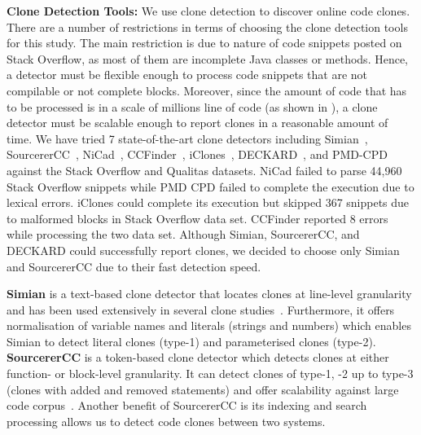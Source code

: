 \documentclass[10pt,journal,compsoc]{IEEEtran}
\begin{document}
\textbf{Clone Detection Tools: } We use clone detection to discover online code
clones. %
There are a number of restrictions in terms of choosing the clone detection
tools for this study. The main restriction is due to nature of code snippets
posted on Stack Overflow, as most of them are incomplete Java classes or
methods. Hence, a detector must be flexible enough to process code snippets that
are not compilable or not complete blocks. Moreover, since the amount of code
that has to be processed is in a scale of millions line of code (as shown in
), a clone detector must be scalable enough to report clones
in a reasonable amount of time. We have tried 7 state-of-the-art clone detectors
including Simian~\cite{simian}, SourcererCC~\cite{Sajnani2016},
NiCad~\cite{Cordy,Roy2008}, CCFinder~\cite{Kamiya2002}, iClones~\cite{Gode2009},
DECKARD~\cite{Jiang2007a}, and PMD-CPD~\cite{pmd-cpd} against the Stack Overflow
and Qualitas datasets. NiCad failed to parse 44,960 Stack Overflow snippets
while PMD CPD failed to complete the execution due to lexical errors. iClones
could complete its execution but skipped 367 snippets due to malformed blocks in
Stack Overflow data set. CCFinder reported 8 errors while processing the two data set. 
Although Simian, SourcererCC, and DECKARD
could successfully report clones, we decided to choose only Simian and
SourcererCC due to their fast detection speed.

\textbf{Simian} is a text-based clone detector that locates clones at line-level
granularity and has been used extensively in several clone
studies~\cite{Ragkhitwetsagul2016, Wang2013, Mondal2011, Cheung2015,
	Krinke2010}. Furthermore, it offers normalisation of variable names and literals
(strings and numbers) which enables Simian to detect literal clones (type-1) and
parameterised clones (type-2). \textbf{SourcererCC} is a token-based clone
detector which detects clones at either function- or block-level granularity. It
can detect clones of type-1, -2 up to type-3 (clones with added and removed
statements) and offer scalability against large code
corpus~\cite{Sajnani2016,Saini2016,Yang2017}. Another benefit of SourcererCC is
its indexing and search processing allows us to detect code clones between two
systems. 
\end{document}

